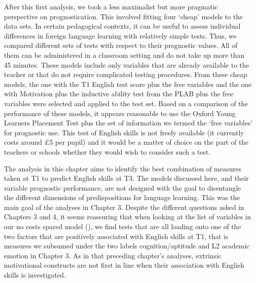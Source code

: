 \documentclass[output=paper]{langsci/langscibook}
\begin{document}
After this first analysis, we took a less maximalist but more pragmatic perspective on prognostication. This involved fitting four ‘cheap’ models to the data sets. In certain pedagogical contexts, it can be useful to assess individual differences in foreign language learning with relatively simple tests. Thus, we compared different sets of tests with respect to their prognostic values. All of them can be administered in a classroom setting and do not take up more than 45 minutes. These models include only variables that are already available to the teacher or that do not require complicated testing procedures. From these cheap models, the one with the T1 English test score plus the free variables and the one with Motivation plus the inductive ability test from the PLAB plus the free variables were selected and applied to the test set. Based on a comparison of the performance of these models, it appears reasonable to use the Oxford Young Learners Placement Test plus the set of information we termed the ‘free variables’ for prognostic use. This test of English skills is not freely available (it currently costs around £5 per pupil) and it would be a matter of choice on the part of the teachers or schools whether they would wish to consider such a test. 

The analysis in this chapter aims to identify the best combination of measures taken at T1 to predict English skills at T3. The models discussed here, and their variable prognostic performance, are not designed with the goal to disentangle the different dimensions of predispositions for language learning. This was the main goal of the analyses in Chapter 3. Despite the different questions asked in Chapters 3 and 4, it seems reassuring that when looking at the list of variables in our no costs spared model (), we find tests that are all loading onto one of the two factors that are positively associated with English skills at T1, that is measures we subsumed under the two labels cognition/aptitude and L2 academic emotion in Chapter 3. As in that preceding chapter’s analyses, extrinsic motivational constructs are not first in line when their association with English skills is investigated. 

{\sloppy\printbibliography[heading=subbibliography,notkeyword=this]}
\end{document}
